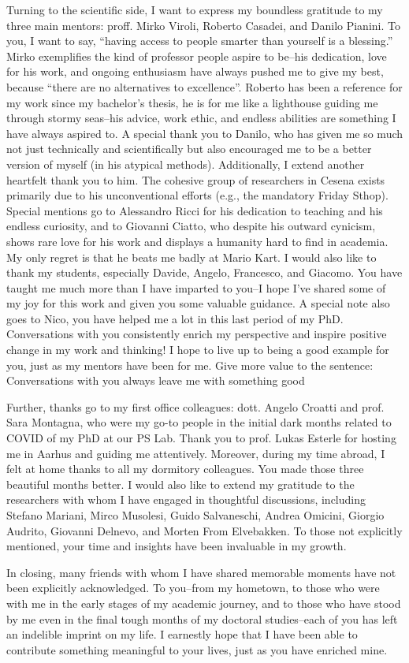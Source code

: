 Turning to the scientific side, 
 I want to express my boundless gratitude to my three main mentors: proff. Mirko Viroli, Roberto Casadei, and Danilo Pianini. 
 To you, I want to say, ``having access to people smarter than yourself is a blessing.'' 
% 
Mirko exemplifies the kind of professor people aspire to be--his dedication, love for his work, 
 and ongoing enthusiasm have always pushed me to give my best, because ``there are no alternatives to excellence''. 
 Roberto has been a reference for my work since my bachelor's thesis, 
 he is for me like a lighthouse guiding me through stormy seas--his advice, work ethic, and endless abilities are something I have always aspired to. 
 A special thank you to Danilo, 
 who has given me so much not just technically and scientifically 
 but also encouraged me to be a better version of myself (in his atypical methods).
 Additionally, I extend another heartfelt thank you to him. The cohesive group of researchers in Cesena exists primarily due to his unconventional efforts (e.g., the mandatory Friday Sthop).
%
Special mentions go to Alessandro Ricci for his dedication to teaching and his endless curiosity, 
 and to Giovanni Ciatto, who despite his outward cynicism, shows rare love for his work and displays a humanity hard to find in academia. 
 My only regret is that he beats me badly at Mario Kart.
%
I would also like to thank my students, especially Davide, Angelo, Francesco, and Giacomo. 
 You have taught me much more than I have imparted to you--I hope I've shared some of my joy for this work and given you some valuable guidance.
%
A special note also goes to Nico, you have helped me a lot in this last period of my PhD.
Conversations with you consistently enrich my perspective and inspire positive change in my work and thinking! 
I hope to live up to being a good example for you, just as my mentors have been for me.
Give more value to the sentence: Conversations with you always leave me with something good

Further, thanks go to my first office colleagues: dott. Angelo Croatti and prof. Sara Montagna, who were my go-to people in the initial dark months related to COVID of my PhD at our PS Lab.
%
Thank you to prof. Lukas Esterle for hosting me in Aarhus and guiding me attentively. 
Moreover, during my time abroad, I felt at home thanks to all my dormitory colleagues. 
You made those three beautiful months better.
%
I would also like to extend my gratitude to the researchers with whom I have engaged in thoughtful discussions, including Stefano Mariani, Mirco Musolesi, Guido Salvaneschi, Andrea Omicini, Giorgio Audrito, Giovanni Delnevo, and Morten From Elvebakken. To those not explicitly mentioned, your time and insights have been invaluable in my growth.

In closing, 
 many friends with whom I have shared memorable moments have not been explicitly acknowledged. 
 To you--from my hometown, to those who were with me in the early stages of my academic journey, and to those who have stood by me even in the final tough months of my doctoral studies--each of you has left an indelible imprint on my life. 
 I earnestly hope that I have been able to contribute something meaningful to your lives, just as you have enriched mine.